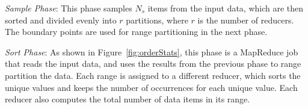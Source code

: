 




\textit{Sample Phase}: This phase samples $N_s$ items from the input data, which are then sorted and divided evenly into $r$ partitions, where $r$ is the number of reducers. The boundary points are used for range partitioning in the next phase.

\textit{Sort Phase}: As shown in Figure~\ref{fig:orderStats}, this phase is a MapReduce job that reads the input data, and uses the results from the previous phase to range partition the data. Each range is assigned to a different reducer, which sorts the unique values and keeps the number of occurrences for each unique value. Each reducer also computes the total number of data items in its range.


